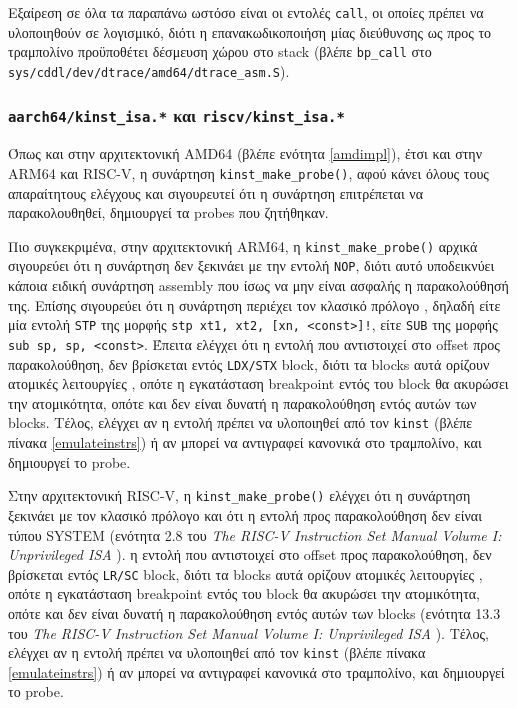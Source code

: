 \documentclass[12pt]{article}
\begin{document}
Εξαίρεση σε όλα τα παραπάνω ωστόσο είναι οι εντολές \lstinline{call}, οι οποίες
πρέπει να υλοποιηθούν σε λογισμικό, διότι η επανακωδικοποιήση μίας διεύθυνσης
ως προς το τραμπολίνο προϋποθέτει δέσμευση χώρου στο stack (βλέπε
\lstinline{bp_call} στο \lstinline{sys/cddl/dev/dtrace/amd64/dtrace_asm.S}).

\subsubsection{\lstinline{aarch64/kinst_isa.*} και \lstinline{riscv/kinst_isa.*}} \label{armriscvimpl}

Όπως και στην αρχιτεκτονική AMD64 (βλέπε ενότητα \ref{amdimpl}), έτσι και στην
ARM64 και RISC-V, η συνάρτηση \lstinline{kinst_make_probe()}, αφού κάνει όλους
τους απαραίτητους ελέγχους και σιγουρευτεί ότι η συνάρτηση επιτρέπεται να
παρακολουθηθεί, δημιουργεί τα probes που ζητήθηκαν.

Πιο συγκεκριμένα, στην αρχιτεκτονική ARM64, η \lstinline{kinst_make_probe()}
αρχικά σιγουρεύει ότι η συνάρτηση δεν ξεκινάει με την εντολή \lstinline{NOP},
διότι αυτό υποδεικνύει κάποια ειδική συνάρτηση assembly που ίσως να μην είναι
ασφαλής η παρακολούθησή της. Επίσης σιγουρεύει ότι η συνάρτηση περιέχει τον
κλασικό πρόλογο \cite{arm64prologueepilogue}, δηλαδή είτε μία εντολή
\lstinline{STP} της μορφής \lstinline{stp xt1, xt2, [xn, <const>]!}, είτε
\lstinline{SUB} της μορφής \lstinline{sub sp, sp, <const>}. Έπειτα ελέγχει ότι
η εντολή που αντιστοιχεί στο offset προς παρακολούθηση, δεν βρίσκεται εντός
\lstinline{LDX/STX} block, διότι τα blocks αυτά ορίζουν ατομικές λειτουργίες
\cite{ldxstx}, οπότε η εγκατάσταση breakpoint εντός του block θα ακυρώσει την
ατομικότητα, οπότε και δεν είναι δυνατή η παρακολούθηση εντός αυτών των blocks.
Τέλος, ελέγχει αν η εντολή πρέπει να υλοποιηθεί από τον \lstinline{kinst}
(βλέπε πίνακα \ref{emulateinstrs}) ή αν μπορεί να αντιγραφεί κανονικά στο
τραμπολίνο, και δημιουργεί το probe.

Στην αρχιτεκτονική RISC-V, η \lstinline{kinst_make_probe()} ελέγχει ότι η
συνάρτηση ξεκινάει με τον κλασικό πρόλογο και ότι η εντολή προς παρακολούθηση
δεν είναι τύπου SYSTEM (ενότητα 2.8 του \textit{The RISC-V Instruction Set
Manual Volume I: Unprivileged ISA} \cite{riscvspecs}).
η εντολή που αντιστοιχεί στο offset προς παρακολούθηση, δεν βρίσκεται εντός
\lstinline{LR/SC} block, διότι τα blocks αυτά ορίζουν ατομικές λειτουργίες
\cite{ldxstx}, οπότε η εγκατάσταση breakpoint εντός του block θα ακυρώσει την
ατομικότητα, οπότε και δεν είναι δυνατή η παρακολούθηση εντός αυτών των blocks
(ενότητα 13.3 του \textit{The RISC-V Instruction Set Manual Volume I:
Unprivileged ISA} \cite{riscvspecs}).
Τέλος, ελέγχει αν η εντολή πρέπει να υλοποιηθεί από τον \lstinline{kinst}
(βλέπε πίνακα \ref{emulateinstrs}) ή αν μπορεί να αντιγραφεί κανονικά στο
τραμπολίνο, και δημιουργεί το probe.
\end{document}
